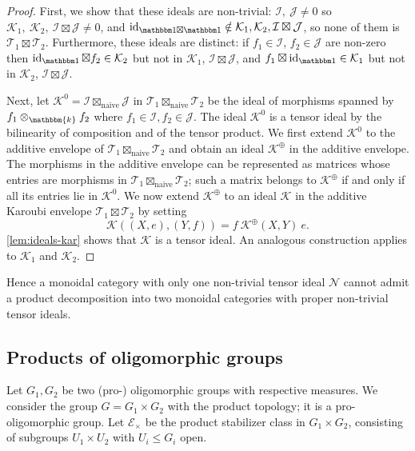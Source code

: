 \documentclass[11pt,a4paper]{amsart}
\theoremstyle{plain}%
\theoremstyle{definition}
\theoremstyle{remark}
\newcommand{\triv}{{\mathbbm 1}}
\newcommand{\id}{\operatorname{id}}
\newcommand{\kk}{\mathbbm{k}}
\begin{document}
\begin{proof}
First, we show that these ideals are non-trivial: $\mathcal{I}, ~\mathcal{J}\neq 0$ so $\mathcal{K}_1, ~\mathcal{K}_2,~\mathcal{I}\boxtimes \mathcal{J} \neq 0$, and $\id_{\triv\boxtimes\triv} \notin \mathcal{K}_1, \mathcal{K}_2, \mathcal{I}\boxtimes \mathcal{J}$, so none of them is $\mathcal{T}_1 \boxtimes \mathcal{T}_2$. Furthermore, these ideals are distinct: if $f_1\in \mathcal{I}$, $f_2\in \mathcal{J}$ are non-zero then $\id_{\triv}\boxtimes f_2\in \mathcal{K}_2$ but not in $\mathcal{K}_1$, $\mathcal{I}\boxtimes \mathcal{J}$, and $f_1\boxtimes \id_{\triv}\in \mathcal{K}_1$ but not in $\mathcal{K}_2$, $\mathcal{I}\boxtimes \mathcal{J}$.

Next, let $\mathcal{K}^0=\mathcal{I}\boxtimes_{\mathrm{naive}} \mathcal{J}$ in $\mathcal{T}_1\boxtimes_{\mathrm{naive}}\mathcal{T}_2$ be the ideal of morphisms spanned by $f_1\otimes_{\kk} f_2$ where $f_1\in \mathcal{I}, f_2\in\mathcal{J}$. The ideal $\mathcal{K}^0$ is a tensor ideal by the bilinearity of composition and of the tensor product. We first extend $\mathcal{K}^0$ to the additive envelope of $\mathcal{T}_1\boxtimes_{\mathrm{naive}}\mathcal{T}_2$ and obtain an ideal $\mathcal{K}^{\oplus}$ in the additive envelope. The morphisms in the additive envelope can be represented as matrices whose entries are morphisms in $\mathcal{T}_1\boxtimes_{\mathrm{naive}}\mathcal{T}_2$; such a matrix belongs to $\mathcal{K}^{\oplus}$ if and only if all its entries lie in $\mathcal{K}^0$. We now extend $\mathcal{K}^{\oplus}$ to an ideal $\mathcal{K}$ in  the additive Karoubi envelope $\mathcal{T}_1 \boxtimes \mathcal{T}_2$ by setting \[\mathcal{K}((X,e),(Y,f))=f~\mathcal{K}^{\oplus}(X,Y)~e.\] \cref{lem:ideals-kar} shows that $\mathcal{K}$ is a tensor ideal. An analogous construction applies to $\mathcal K_1$ and $\mathcal K_2$.
\end{proof}


Hence a monoidal category with only one non-trivial tensor ideal $\mathcal{N}$ cannot admit a product decomposition into two  monoidal categories with proper non-trivial tensor ideals.



\subsection{Products of oligomorphic groups}\label{sec:products}
Let $G_1, G_2$ be two (pro-) oligomorphic groups with respective measures. We consider the group $G = G_1\times G_2$ with the product topology; it is a pro-oligomorphic group. Let $\mathcal{E}_{\times}$ be the product stabilizer class in $G_1\times G_2$, consisting of subgroups $U_1\times U_2$ with $U_i\leq G_i$ open.
\end{document}
